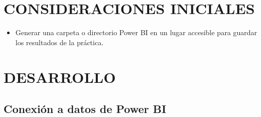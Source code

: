 \documentclass[12pt,letterpaper]{article}
\begin{document}
    \section{CONSIDERACIONES INICIALES}
    \begin{itemize}
        \item Generar una carpeta o directorio Power BI en un lugar accesible para guardar los resultados de la práctica.
    \end{itemize}
    \newpage
    \section{DESARROLLO}
    \subsection{Conexión a datos de Power BI}
\end{document}

